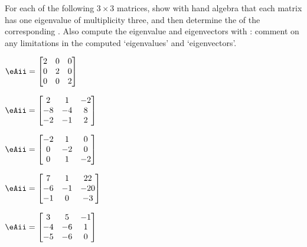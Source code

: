 \begin{exercise} \label{ex:} 
For each of the following \(3\times3\) matrices, show with hand algebra that each matrix has one eigenvalue of multiplicity three, and then determine the  of the corresponding .
Also compute the eigenvalue and eigenvectors with \script: comment on any limitations in the computed `eigenvalues' and `eigenvectors'.
\begin{parts}
\item \(\eAii=\begin{bmatrix} 2 & 0 & 0
\\0 & 2 & 0
\\0 & 0 & 2 \end{bmatrix}\)

\item \(\eAii=\begin{bmatrix} 2 & 1 & -2
\\-8 & -4 & 8
\\-2 & -1 & 2 \end{bmatrix}\)

\item \(\eAii=\begin{bmatrix} -2 & 1 & 0
\\0 & -2 & 0
\\0 & 1 & -2 \end{bmatrix}\)

\item \(\eAii=\begin{bmatrix} 7 & 1 & 22
\\-6 & -1 & -20
\\-1 & 0 & -3 \end{bmatrix}\)

\item \(\eAii=\begin{bmatrix} 3 & 5 & -1
\\-4 & -6 & 1
\\-5 & -6 & 0 \end{bmatrix}\)


\end{parts}
\end{exercise}
